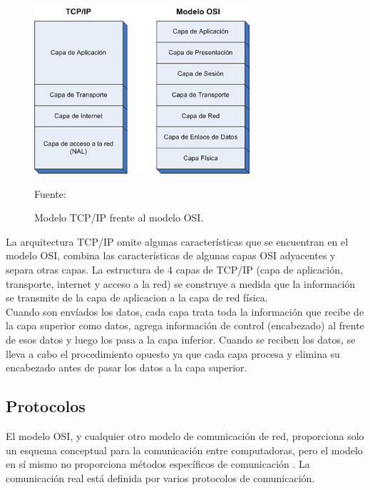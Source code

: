 \begin{figure}[H]
    \centering
    \includegraphics[width=8cm]{img/capitulo_2/tcp_ip_osi.jpg}\\
    \medskip
    \caption{Modelo TCP/IP frente al modelo OSI.\\}
    Fuente: \cite{tcpiposi}
    \label{fig:tcpip}
\end{figure}

La arquitectura TCP/IP omite algunas características que se encuentran en el modelo OSI, combina las características de algunas capas OSI adyacentes y separa otras capas. La estructura de 4 capas de TCP/IP (capa de aplicación, transporte, internet y acceso a la red) se construye a medida que la información se transmite de la capa de aplicacion a la capa de red física.\\

Cuando son envíados los datos, cada capa trata toda la información que recibe de la capa superior como datos, agrega información de control (encabezado) al frente de esos datos y luego los pasa a la capa inferior. Cuando se reciben los datos, se lleva a cabo el procedimiento opuesto ya que cada capa procesa y elimina su encabezado antes de pasar los datos a la capa superior.\\

\subsection{Protocolos}
El modelo OSI, y cualquier otro modelo de comunicación de red, proporciona solo un esquema conceptual para la comunicación entre computadoras, pero el modelo en sí mismo no proporciona métodos específicos de comunicación \cite{wikipedia:modeloosi}. La comunicación real está definida por varios protocolos de comunicación.\\


